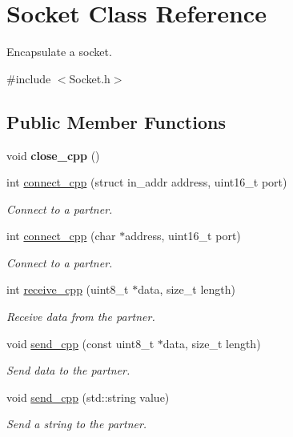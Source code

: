 \hypertarget{class_socket}{}\section{Socket Class Reference}
\label{class_socket}


Encapsulate a socket.  




{\ttfamily \#include $<$Socket.\+h$>$}

\subsection*{Public Member Functions}
\begin{DoxyCompactItemize}
\item 
void {\bfseries close\+\_\+cpp} ()\hypertarget{class_socket_a2f39e65b68fcae82a3c9f2665c7ab812}{}\label{class_socket_a2f39e65b68fcae82a3c9f2665c7ab812}

\item 
int \hyperlink{class_socket_a453f3704a57418550aa4f93eb3e7e583}{connect\+\_\+cpp} (struct in\+\_\+addr address, uint16\+\_\+t port)
\begin{DoxyCompactList}\small\item\em Connect to a partner. \end{DoxyCompactList}\item 
int \hyperlink{class_socket_a67d57f2841b0469f8d5e4d1c73e81871}{connect\+\_\+cpp} (char $\ast$address, uint16\+\_\+t port)
\begin{DoxyCompactList}\small\item\em Connect to a partner. \end{DoxyCompactList}\item 
int \hyperlink{class_socket_a58b0eba9803e12930dff91eabe00ae18}{receive\+\_\+cpp} (uint8\+\_\+t $\ast$data, size\+\_\+t length)
\begin{DoxyCompactList}\small\item\em Receive data from the partner. \end{DoxyCompactList}\item 
void \hyperlink{class_socket_a75d4cde966c827df816de5c086dde520}{send\+\_\+cpp} (const uint8\+\_\+t $\ast$data, size\+\_\+t length)
\begin{DoxyCompactList}\small\item\em Send data to the partner. \end{DoxyCompactList}\item 
void \hyperlink{class_socket_acfe9059df34833daa92b381492e20446}{send\+\_\+cpp} (std\+::string value)
\begin{DoxyCompactList}\small\item\em Send a string to the partner. \end{DoxyCompactList}\end{DoxyCompactItemize}


